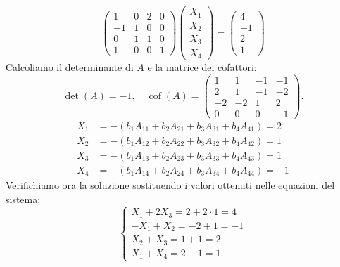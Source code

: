 \documentclass{article}
\theoremstyle{plain}
\theoremstyle{definition}
\theoremstyle{remark}
\begin{document}
\begin{enumerate}
\[\begin{pmatrix}
                1&0&2&0\\
                -1&1&0&0\\
                0&1&1&0\\
                1&0&0&1
            \end{pmatrix}
            \begin{pmatrix}
                X_1\\
                X_2\\
                X_3\\
                X_4
            \end{pmatrix}=
            \begin{pmatrix}
                4\\
                -1\\
                2\\
                1
            \end{pmatrix}\]
        Calcoliamo il determinante di $A$ e la matrice dei cofattori:
        \[
            \det(A)=-1,\quad \operatorname{cof}(A)=
            \begin{pmatrix}
            1&1&-1&-1\\
            2&1&-1&-2\\
            -2&-2&1&2\\
            0&0&0&-1
            \end{pmatrix}.
        \]
        \begin{align*}
            X_1 &= -(b_1A_{11}+b_2A_{21}+b_3A_{31}+b_4A_{41})=2\\
            X_2 &= -(b_1A_{12}+b_2A_{22}+b_3A_{32}+b_4A_{42})=1\\
            X_3 &= -(b_1A_{13}+b_2A_{23}+b_3A_{33}+b_4A_{43})=1\\
            X_4 &= -(b_1A_{14}+b_2A_{24}+b_3A_{34}+b_4A_{44})=-1
        \end{align*}
        Verifichiamo ora la soluzione sostituendo i valori ottenuti nelle equazioni del sistema:
        \[\begin{cases}
            X_1+2X_3=2+2\cdot1=4\\
            -X_1+X_2=-2+1=-1\\
            X_2+X_3=1+1=2\\
            X_1+X_4=2-1=1
        \end{cases}\]
\end{enumerate}


\vspace{10pt}
\end{document}
